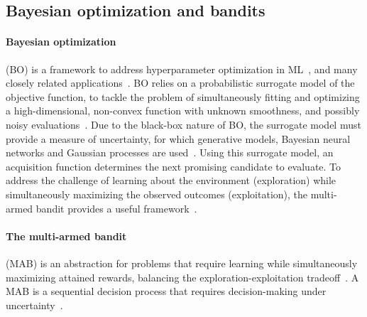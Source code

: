 
\subsection{Bayesian optimization and bandits}
\label{ssec:mab}

\paragraph*{Bayesian optimization}\hspace*{-2ex} (BO) is a framework to address hyperparameter optimization in ML~\citep{ip-Snoek2012,ip-Klein2017,j-turner2021bayesian},
and many closely related applications~\citep{j-Negoescu2011,j-Calandra2016,ic-Frazier2016,ip-Hernandez-Lobato2017,j-Candelieri2018}.
BO relies on a probabilistic surrogate model of the objective function,
to tackle the problem of simultaneously fitting and optimizing a high-dimensional, non-convex function with unknown smoothness, and possibly
noisy evaluations~\citep{shahriari2015bayesian,j-Frazier2018}.
Due to the black-box nature of BO, the surrogate model must provide a measure of uncertainty, for which 
generative models, Bayesian neural networks and Gaussian processes are used~\citep{j-Maddox2021}.
Using this surrogate model, an acquisition function determines the next promising candidate to evaluate.
To address the challenge of learning about the environment (\ie exploration)
while simultaneously maximizing the observed outcomes (\ie exploitation),
the multi-armed bandit provides a useful framework~\citep{j-Lai1985}.

\paragraph*{The multi-armed bandit}\hspace*{-2ex} (MAB) is
an abstraction for problems that require learning while simultaneously maximizing attained rewards,
\ie balancing the exploration-exploitation tradeoff~\citep{b-Lattimore2020}.
A MAB is a sequential decision process
that requires decision-making under uncertainty~\citep{j-Slivkins2019}.

